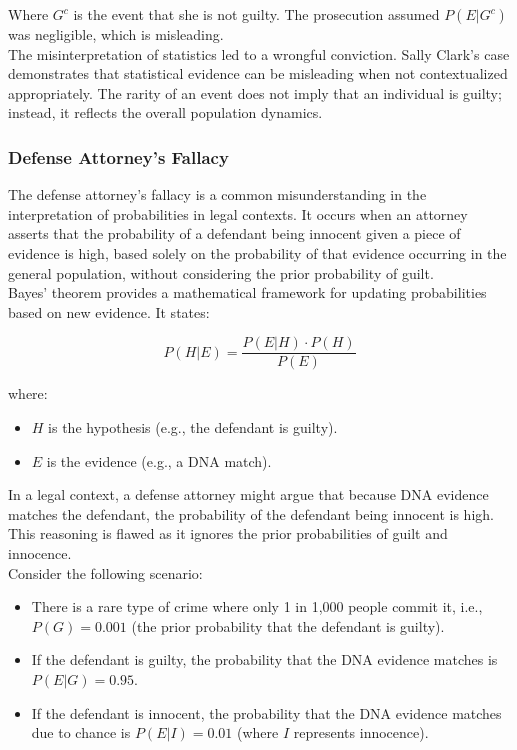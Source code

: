 Where \( G^c \) is the event that she is not guilty. The prosecution assumed \( P(E|G^c) \) was negligible, which is misleading.\\

The misinterpretation of statistics led to a wrongful conviction. Sally Clark's case demonstrates that statistical evidence can be misleading when not contextualized appropriately. The rarity of an event does not imply that an individual is guilty; instead, it reflects the overall population dynamics.

\subsubsection{Defense Attorney's Fallacy}

The defense attorney's fallacy is a common misunderstanding in the interpretation of probabilities in legal contexts. It occurs when an attorney asserts that the probability of a defendant being innocent given a piece of evidence is high, based solely on the probability of that evidence occurring in the general population, without considering the prior probability of guilt.\\

Bayes' theorem provides a mathematical framework for updating probabilities based on new evidence. It states:

\[
P(H|E) = \frac{P(E|H) \cdot P(H)}{P(E)}
\]

where:
\begin{itemize}
    \item \( H \) is the hypothesis (e.g., the defendant is guilty).
    \item \( E \) is the evidence (e.g., a DNA match).
\end{itemize}

In a legal context, a defense attorney might argue that because DNA evidence matches the defendant, the probability of the defendant being innocent is high. This reasoning is flawed as it ignores the prior probabilities of guilt and innocence.\\

Consider the following scenario:
\begin{itemize}
    \item There is a rare type of crime where only 1 in 1,000 people commit it, i.e., \( P(G) = 0.001 \) (the prior probability that the defendant is guilty).
    \item  If the defendant is guilty, the probability that the DNA evidence matches is \( P(E|G) = 0.95 \).
    \item If the defendant is innocent, the probability that the DNA evidence matches due to chance is \( P(E|I) = 0.01 \) (where \( I \) represents innocence).
\end{itemize}

